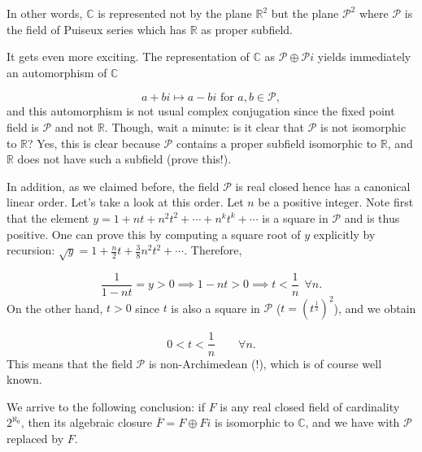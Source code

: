 \documentclass[11pt]{article}
\theoremstyle{plain}
\theoremstyle{definition}
\theoremstyle{remark}
\begin{document}
\begin{figure}[h!]
    \centering
    \caption{\label{diag:P_plot}}

\end{figure}
\noindent
In other words, $\mathbb{C}$ is represented not by the plane $\mathbb{R}^2$ but the plane $\mathcal{P}^2$ where $\mathcal{P}$ is the field of Puiseux series which has $\mathbb{R}$ as proper subfield.
\par
It gets even more exciting. The representation of $\mathbb{C}$ as  $\mathcal{P} \oplus \mathcal{P}i$ yields immediately an automorphism of $\mathbb{C}$

$$ a + bi \mapsto a - bi \textrm{ for } a, b \in \mathcal{P},$$
and this automorphism is not usual complex conjugation since the fixed point field is $\mathcal{P}$ and not $\mathbb{R}$. Though, wait a minute: is it clear that $\mathcal{P}$ is not isomorphic
to $\mathbb{R}$? Yes, this is clear because $\mathcal{P}$ contains a proper subfield isomorphic to $\mathbb{R}$, and $\mathbb{R}$ does not have such a subfield (prove this!).

In addition, as we claimed before, the field $\mathcal{P}$ is real closed hence has a  canonical linear order. Let's take a look at this order. Let $n$ be a positive integer. Note first that the element $y = 1  + nt + n^2 t^2 + \cdots + n^kt^k+ \cdots$ is a square in $\mathcal{P}$ and is thus positive. One can prove this by computing a square root of $y$ explicitly by recursion: 
$ \sqrt{y} = 1 + \frac{n}{2}t + \frac{3}{8}n^2 t^2 + \cdots $. Therefore, 

$$
\frac{1}{1-nt}= y > 0 \implies 1 - nt > 0 \implies t < \frac{1}{n} \:\: \forall n.
$$
On the other hand, $t > 0$ since $t$ is also a square in $\mathcal{P}$ ($t = (t^{\frac{1}{2}})^2$), and we obtain

$$ 0 < t < \frac{1}{n} \qquad \forall n.$$
This means that the field $\mathcal{P}$ is non-Archimedean (!), which is of course well known.
\par
We arrive to the following conclusion: if $F$ is any real closed field of cardinality $2^{\aleph_0}$, then its algebraic closure $\overline{F} = F \oplus Fi$ is isomorphic to $\mathbb{C}$, and we have  with $\mathcal{P}$ replaced by $F$.
\par
\end{document}
